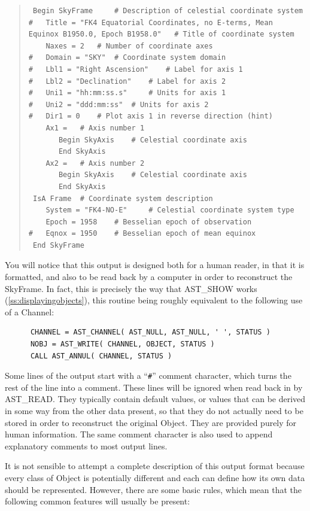 \documentclass[twoside,11pt]{article}
\newcommand{\htmlref}[2]{#1}
\newcommand{\secref}[1]{\S\ref{#1}}
\renewcommand{\secref}[1]{\ref{#1}}
\begin{document}
\begin{quote}
\small
\begin{verbatim}
 Begin SkyFrame 	# Description of celestial coordinate system
#   Title = "FK4 Equatorial Coordinates, no E-terms, Mean Equinox B1950.0, Epoch B1958.0" 	# Title of coordinate system
    Naxes = 2 	# Number of coordinate axes
#   Domain = "SKY" 	# Coordinate system domain
#   Lbl1 = "Right Ascension" 	# Label for axis 1
#   Lbl2 = "Declination" 	# Label for axis 2
#   Uni1 = "hh:mm:ss.s" 	# Units for axis 1
#   Uni2 = "ddd:mm:ss" 	# Units for axis 2
#   Dir1 = 0 	# Plot axis 1 in reverse direction (hint)
    Ax1 = 	# Axis number 1
       Begin SkyAxis 	# Celestial coordinate axis
       End SkyAxis
    Ax2 = 	# Axis number 2
       Begin SkyAxis 	# Celestial coordinate axis
       End SkyAxis
 IsA Frame 	# Coordinate system description
    System = "FK4-NO-E" 	# Celestial coordinate system type
    Epoch = 1958 	# Besselian epoch of observation
#   Eqnox = 1950 	# Besselian epoch of mean equinox
 End SkyFrame
\end{verbatim}
\normalsize
\end{quote}

You will notice that this output is designed both for a human reader,
in that it is formatted, and also to be read back by a computer in
order to reconstruct the SkyFrame. In fact, this is precisely the way
that \htmlref{AST\_SHOW}{AST_SHOW} works (\secref{ss:displayingobjects}), this routine
being roughly equivalent to the following use of a Channel:

\small
\begin{verbatim}
      CHANNEL = AST_CHANNEL( AST_NULL, AST_NULL, ' ', STATUS )
      NOBJ = AST_WRITE( CHANNEL, OBJECT, STATUS )
      CALL AST_ANNUL( CHANNEL, STATUS )
\end{verbatim}
\normalsize

Some lines of the output start with a ``\verb?#?'' comment character,
which turns the rest of the line into a comment. These lines will be
ignored when read back in by \htmlref{AST\_READ}{AST_READ}.  They typically contain
default values, or values that can be derived in some way from the
other data present, so that they do not actually need to be stored in
order to reconstruct the original Object. They are provided purely for
human information. The same comment character is also used to append
explanatory comments to most output lines.

It is not sensible to attempt a complete description of this output
format because every class of Object is potentially different and each
can define how its own data should be represented. However, there are
some basic rules, which mean that the following common features will
usually be present:
\end{document}
